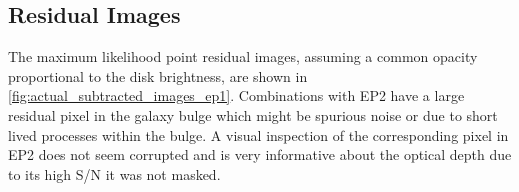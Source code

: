 \documentclass{aa}
\begin{document}

\subsection{Residual Images}
\label{sec:res_residual_images}

The maximum likelihood point residual images, assuming a common opacity proportional to the disk brightness, are shown in \autoref{fig:actual_subtracted_images_ep1}. Combinations with EP2 have a large residual pixel in the galaxy bulge which might be spurious noise or due to short lived processes within the bulge. A visual inspection of the corresponding pixel in EP2 does not seem corrupted and is very informative about the optical depth due to its high S/N it was not masked.


\end{document}
